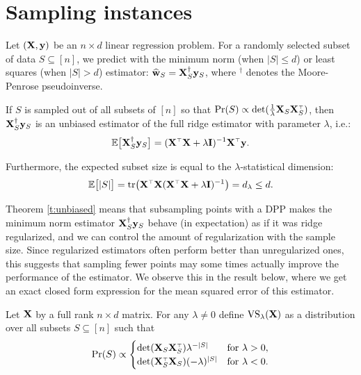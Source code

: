 \documentclass[12pt]{sty/colt2019/colt2018-arxiv}
\begin{document}
\section{Sampling instances}
Let $(\mathbf X,\mathbf y)$ be an $n\times d$ linear regression problem. For a
randomly selected subset of data $S\subseteq [n]$, we predict with the
minimum norm (when $|S|\leq d$) or least squares (when $|S|>d$)
estimator: $\widehat{\mathbf w}_S = \mathbf X_S^\dagger\mathbf y_S$, where $^\dagger$ denotes 
the Moore-Penrose pseudoinverse. 
\begin{theorem}\label{t:unbiased}
  If $S$ is sampled out of all subsets of $[n]$ so that $\Pr(S)\propto 
  \det(\frac1\lambda\X_S\X_S^\top)$, then $\mathbf X_S^\dagger\mathbf y_S$ is an unbiased
  estimator of the full ridge estimator with parameter $\lambda$, i.e.:
  \begin{align*}
    \E\big[\X_S^\dagger\y_S\big] = (\X^\top\X+\lambda\I)^{-1}\X^\top\y.
  \end{align*}
\end{theorem}
\begin{remark}
Furthermore, the expected subset size is equal to the
$\lambda$-statistical dimension:
\begin{align*}
  \E\big[|S|\big] =
    \tr\big(\X^\top\X(\X^\top\X+\lambda\I)^{-1}\big) = d_\lambda\leq d.
\end{align*}
\end{remark}
Theorem \ref{t:unbiased} means that subsampling points with a DPP
makes the minimum norm estimator $\mathbf X_S^\dagger\mathbf y_S$ behave (in expectation) as if it
was ridge regularized, and we can control the amount of regularization
with the sample size. Since regularized estimators often perform
better than unregularized ones, this suggests that sampling fewer
points may some times actually improve the performance of the
estimator. We observe this in the result below, where we get an exact
closed form expression for the mean squared error of this estimator.
\begin{definition}
  Let $\mathbf X$ by a full rank $n\times d$ matrix. For any $\lambda\neq 0$
  define ${\mathrm{VS}}_\lambda(\mathbf X)$ as a distribution over all subsets
  $S\subseteq[n]$ such that
  \begin{align*}
    \Pr(S) \propto \begin{cases}
      \det(\X_S\X_S^\top)\lambda^{-|S|}&\text{for }\lambda > 0,\\
      \det(\X_S^\top\X_S)(-\lambda)^{|S|}&\text{for }\lambda<0.
      \end{cases}
  \end{align*}
\end{definition}
\end{document}
